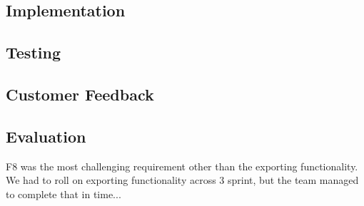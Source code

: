 	\subsection{Implementation}
	\subsection{Testing}

	\subsection{Customer Feedback}

	\subsection{Evaluation} 
F8 was the most challenging requirement other than the exporting functionality. We had to roll on exporting functionality across 3 sprint, but the team managed to complete that in time... 
